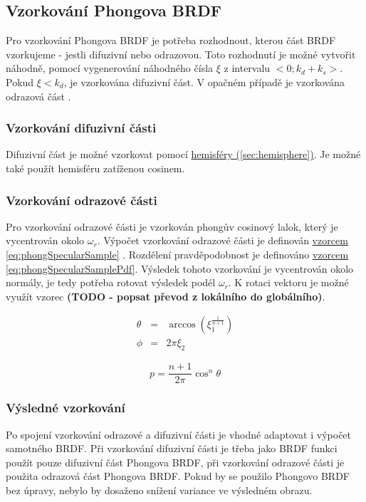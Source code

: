 \documentclass[czech,master,dept460,male,cpp,cpdeclaration]{diploma}
\newcommand{\randU}{\xi_{1}}
\newcommand{\randV}{\xi_{2}}
\newcommand{\refl}{\omega_{r}}
\begin{document}
\subsection{Vzorkování Phongova BRDF}
Pro vzorkování Phongova BRDF je potřeba rozhodnout, kterou část BRDF vzorkujeme - jestli difuzivní nebo odrazovou. Toto rozhodnutí je možné vytvořit náhodně, pomocí vygenerování náhodného čísla $\xi$ z intervalu $<0;k_d+k_s>$. Pokud $\xi < k_d$, je vzorkována difuzivní část. V opačném případě je vzorkována odrazová část \cite{KrivanekBRDFIBL}.
\subsubsection{Vzorkování difuzivní části}
Difuzivní část je možné vzorkovat pomocí \hyperref[sec:hemisphere]{hemisféry (\ref{sec:hemisphere})}. Je možné také použít hemisféru zatíženou cosinem.

\subsubsection{Vzorkování odrazové části}
Pro vzorkování odrazové části je vzorkován phongův cosinový lalok, který je vycentrován okolo $\refl$. Výpočet vzorkování odrazové části je definován \hyperref[eq:phongSpecularSample]{vzorcem \ref{eq:phongSpecularSample}} \cite{KrivanekBRDFIBL}. Rozdělení pravděpodobnost je definováno \hyperref[eq:phongSpecularSamplePdf]{vzorcem \ref{eq:phongSpecularSamplePdf}}.
Výsledek tohoto vzorkování je vycentrován okolo normály, je tedy potřeba rotovat výsledek podél $\refl$. K rotaci vektoru je možné využít vzorec \textbf{(TODO - popsat převod z lokálního do globálního)}.

\begin{eqnarray}
    \theta & = & \arccos(\randU^{\frac{1}{n+1}}) \nonumber \\
    \phi & = & 2\pi\randV\label{eq:phongSpecularSample}
\end{eqnarray}

\begin{equation} \label{eq:phongSpecularSamplePdf}
    p = \frac{n+1}{2\pi}\cos^n\theta
\end{equation}

\subsubsection{Výsledné vzorkování}
Po spojení vzorkování odrazové a difuzivní části je vhodné adaptovat i výpočet samotného BRDF. Při vzorkování difuzivní části je třeba jako BRDF funkci použít pouze difuzivní část Phongova BRDF, při vzorkování odrazové části je použita odrazová část Phongova BRDF. Pokud by se použilo Phongovo BRDF bez úpravy, nebylo by dosaženo snížení variance ve výsledném obrazu. \cite{KrivanekBRDFIBL}

\printbibliography[title={Literatura}, heading=bibintoc]

\appendix
\end{document}
